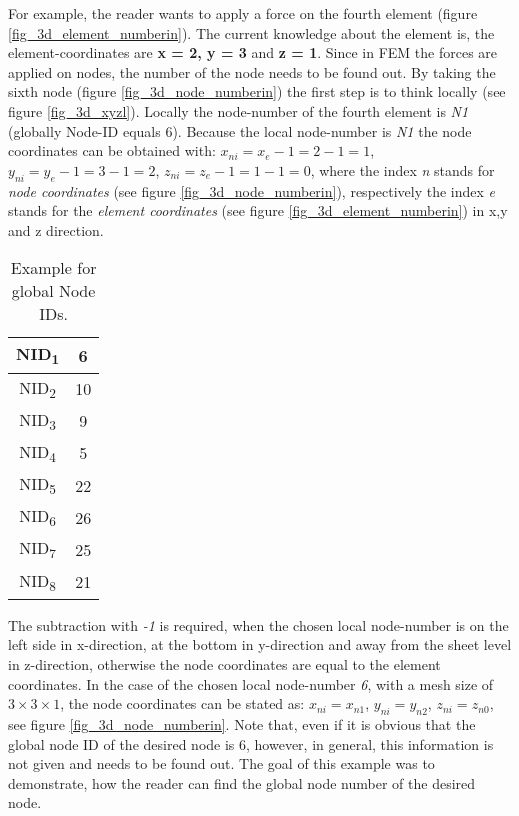 \begin{table}[!h]
    \begin{minipage}{0.65\textwidth}
   For example, the reader wants to apply a force on the fourth element (figure \ref{fig_3d_element_numberin}). The current knowledge about
   the element is, the element-coordinates are \textbf {x = 2, y = 3 } and \textbf{z = 1}.    
   Since in FEM the forces are applied on nodes, the number
   of the node needs to be found out. By taking the sixth node 
   (figure \ref{fig_3d_node_numberin})
   the first step is to
    think locally (see figure \ref{fig_3d_xyzl}).
     Locally the node-number of the fourth element is \emph{N1}
     (globally Node-ID equals 6).
     Because the local node-number is \emph{N1} the node coordinates can be
     obtained with:
     $x_{ni} = x_{e}-1 = 2-1 = 1$, $y_{ni} = y_{e}-1 = 3-1 = 2$,
     $z_{ni} = z_{e}-1 = 1-1 = 0$, where the index \emph{n} stands for
     \emph{node coordinates} (see figure \ref{fig_3d_node_numberin}), respectively
     the index \emph{e} stands for the \emph{element coordinates}
     (see figure \ref{fig_3d_element_numberin}) in x,y and z
     direction.
   \end{minipage}
   \hfill
   \begin{minipage}{0.3\textwidth}
   \centering
   \begin{tabular}{|c|c|}
 \hline 
 NID\textsubscript{1} &6 \\ 
 \hline 
 NID\textsubscript{2} & 10 \\ 
 \hline 
 NID\textsubscript{3} & 9 \\ 
 \hline 
 NID\textsubscript{4} & 5 \\ 
 \hline 
 NID\textsubscript{5}& 22 \\ 
 \hline 
 NID\textsubscript{6} & 26 \\ 
 \hline 
 NID\textsubscript{7} & 25 \\ 
 \hline 
 NID\textsubscript{8} & 21 \\ 
 \hline 
 \end{tabular} 
 \caption{Example for global Node IDs.} 
        \label{table_nID_example}
   \end{minipage}
            \end{table}
               	 The subtraction with \emph{-1} is required, when the
     chosen local node-number is on the left side in x-direction, at the bottom
     in y-direction and away from the sheet level in z-direction, otherwise the node
     coordinates are equal to the element coordinates.
     In the case of the chosen local node-number \emph{6}, with a mesh size of
     $3 \times 3 \times 1$, the node coordinates can be stated as:
     $x_{ni} = x_{n1}$, $y_{ni} = y_{n2}$,
     $z_{ni} = z_{n0}$, see figure \ref{fig_3d_node_numberin}.
     Note that, even if it is obvious that the global
   node ID of the desired node is 6, however,
    in general, this information is not given and needs to be found out. 
    The goal of this example was to demonstrate, how the reader can find the global node number of the desired node.\\  
    
